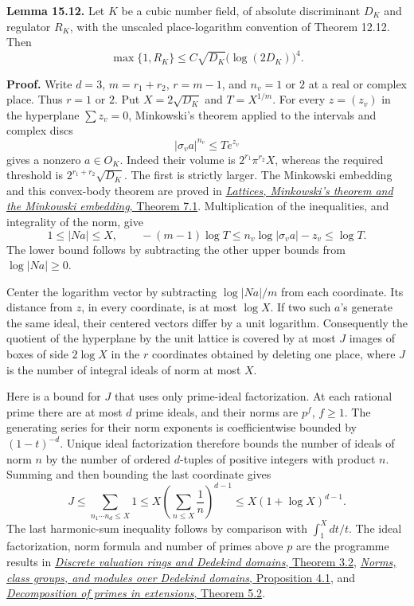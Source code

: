 \documentclass[
  11pt,
  a4paper,
]{article}
\begin{document}
\textbf{Lemma 15.12.} Let \(K\) be a cubic number field, of absolute
discriminant \(D_K\) and regulator \(R_K\), with the unscaled
place-logarithm convention of Theorem 12.12. Then \[
\max\{1,R_K\}\le C\sqrt{D_K}\bigl(\log(2D_K)\bigr)^4.
\tag{15.57}
\]

\textbf{Proof.} Write \(d=3\), \(m=r_1+r_2\), \(r=m-1\), and \(n_v=1\)
or \(2\) at a real or complex place. Thus \(r=1\) or \(2\). Put
\(X=2\sqrt{D_K}\) and \(T=X^{1/m}\). For every \(z=(z_v)\) in the
hyperplane \(\sum z_v=0\), Minkowski's theorem applied to the intervals
and complex discs \[
|\sigma_v a|^{n_v}\le T e^{z_v}
\] gives a nonzero \(a\in O_K\). Indeed their volume is
\(2^{r_1}\pi^{r_2}X\), whereas the required threshold is
\(2^{r_1+r_2}\sqrt{D_K}\). The first is strictly larger. The Minkowski
embedding and this convex-body theorem are proved in
\href{https://kokunoyumeto.github.io/open-math-courses-public/courses/NT-ANT/lattices-minkowskis-theorem-and-the-minkowski-embedding.html}{\emph{Lattices,
Minkowski's theorem and the Minkowski embedding}, Theorem 7.1}.
Multiplication of the inequalities, and integrality of the norm, give \[
1\le |Na|\le X,\qquad
-(m-1)\log T\le n_v\log|\sigma_v a|-z_v\le\log T.
\] The lower bound follows by subtracting the other upper bounds from
\(\log|Na|\ge0\).

Center the logarithm vector by subtracting \(\log|Na|/m\) from each
coordinate. Its distance from \(z\), in every coordinate, is at most
\(\log X\). If two such \(a\)'s generate the same ideal, their centered
vectors differ by a unit logarithm. Consequently the quotient of the
hyperplane by the unit lattice is covered by at most \(J\) images of
boxes of side \(2\log X\) in the \(r\) coordinates obtained by deleting
one place, where \(J\) is the number of integral ideals of norm at most
\(X\).

Here is a bound for \(J\) that uses only prime-ideal factorization. At
each rational prime there are at most \(d\) prime ideals, and their
norms are \(p^f\), \(f\ge1\). The generating series for their norm
exponents is coefficientwise bounded by \((1-t)^{-d}\). Unique ideal
factorization therefore bounds the number of ideals of norm \(n\) by the
number of ordered \(d\)-tuples of positive integers with product \(n\).
Summing and then bounding the last coordinate gives \[
J\le
\sum_{n_1\cdots n_d\le X}1
\le X\left(\sum_{n\le X}\frac1n\right)^{d-1}
\le X(1+\log X)^{d-1}.
\] The last harmonic-sum inequality follows by comparison with
\(\int_1^X dt/t\). The ideal factorization, norm formula and number of
primes above \(p\) are the programme results in
\href{https://kokunoyumeto.github.io/open-math-courses-public/courses/NT-ANT/discrete-valuation-rings-and-dedekind-domains.html}{\emph{Discrete
valuation rings and Dedekind domains}, Theorem 3.2},
\href{https://kokunoyumeto.github.io/open-math-courses-public/courses/NT-ANT/norms-class-groups-and-modules-over-dedekind-domains.html}{\emph{Norms,
class groups, and modules over Dedekind domains}, Proposition 4.1}, and
\href{https://kokunoyumeto.github.io/open-math-courses-public/courses/NT-ANT/decomposition-of-primes-in-extensions.html}{\emph{Decomposition
of primes in extensions}, Theorem 5.2}.
\end{document}
